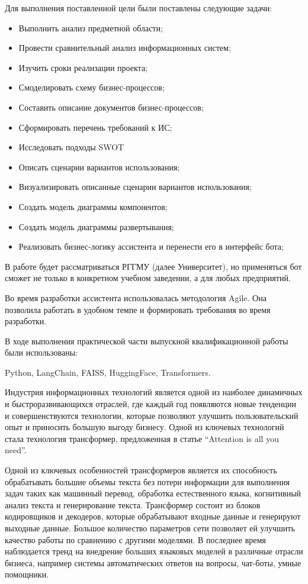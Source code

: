 Для выполнения поставленной цели были поставлены следующие задачи:
\begin{itemize}
    \item Выполнить анализ предметной области;
    \item Провести сравнительный анализ информационных систем;
    \item Изучить сроки реализации проекта;
    \item Смоделировать схему бизнес-процессов;
    \item Составить описание документов бизнес-процессов;
    \item Сформировать перечень требований к ИС;
    \item Исследовать подходы SWOT
    \item Описать сценарии вариантов использования;
    \item Визуализировать описанные сценарии вариантов использования;
    \item Создать модель диаграммы компонентов;
    \item Создать модель диаграммы развертывания;
    \item Реализовать бизнес-логику ассистента и перенести его в интерфейс бота;
\end{itemize}

В работе будет рассматриваться РГГМУ (далее Университет), но применяться бот
сможет не только в конкретном учебном заведении, а для любых предприятий.

Во время разработки ассистента использовалась методология Agile. Она позволила
работать в удобном темпе и формировать требования во время разработки.

В ходе выполнения практической части выпускной квалификационной
работы были использованы:

Python, LangChain, FAISS, HuggingFace, Transformers.


Индустрия информационных технологий является одной из наиболее динамичных и 
быстроразвивающихся отраслей, где каждый год появляются новые тенденции и
совершенствуются технологии, которые позволяют улучшить пользовательский опыт 
и приносить большую выгоду бизнесу. Одной из ключевых технологий стала 
технология трансформер, предложенная в статье “Attention is all you need”.

Одной из ключевых особенностей трансформеров является их способность 
обрабатывать большие объемы текста без потери информации для выполнения задач
таких как машинный перевод, обработка естественного языка, когнитивный анализ
текста и генерирование текста. Трансформер состоит из блоков кодировщиков и
декодеров, которые обрабатывают входные данные и генерируют выходные данные.
Большое количество параметров сети позволяет ей улучшить качество работы по 
сравнению с другими моделями. В последнее время наблюдается тренд
на внедрение больших языковых моделей в различные отрасли бизнеса, например
системы автоматических ответов на вопросы, чат-боты, умные помощники. 


